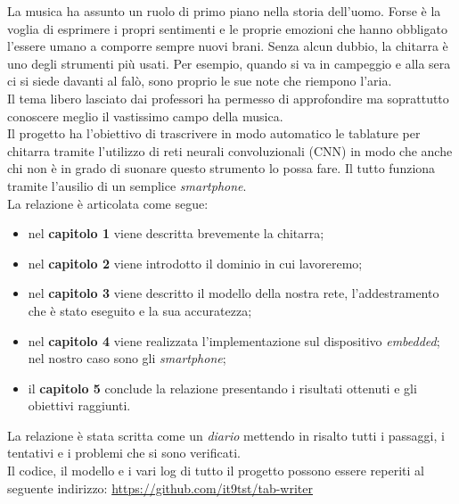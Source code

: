 La musica ha assunto un ruolo di primo piano nella storia dell'uomo. Forse è la voglia di esprimere i propri sentimenti e le proprie emozioni che hanno obbligato l'essere umano a comporre sempre nuovi brani. Senza alcun dubbio, la chitarra è uno degli strumenti più usati. Per esempio, quando si va in campeggio e alla sera ci si siede davanti al falò, sono proprio le sue note che riempono l'aria.\\ Il tema libero lasciato dai professori ha permesso di approfondire ma soprattutto conoscere meglio il vastissimo campo della musica.  \\ Il progetto ha l'obiettivo di trascrivere in modo automatico le tablature per chitarra tramite l'utilizzo di reti neurali convoluzionali (CNN) in modo che anche chi non è in grado di suonare questo strumento lo possa fare. Il tutto funziona tramite l'ausilio di un semplice \textit{smartphone}. \\

La relazione è articolata come segue:
\begin{itemize}
	\item nel \textbf{capitolo 1} viene descritta brevemente la chitarra;
	\item nel \textbf{capitolo 2} viene introdotto il dominio in cui lavoreremo;
	\item nel \textbf{capitolo 3} viene descritto il modello della nostra rete, l'addestramento che è stato eseguito e la sua accuratezza;
	\item nel \textbf{capitolo 4} viene realizzata l'implementazione sul dispositivo \textit{embedded}; nel nostro caso sono gli \textit{smartphone};
	\item il \textbf{capitolo 5} conclude la relazione presentando i risultati ottenuti e gli obiettivi raggiunti.
\end{itemize}
La relazione è stata scritta come un \textit{diario} mettendo in risalto tutti i passaggi, i tentativi e i problemi che si sono verificati.\\
\newline
Il codice, il modello e i vari log di tutto il progetto possono essere reperiti al seguente indirizzo: \href{https://github.com/it9tst/tab-writer}{https://github.com/it9tst/tab-writer} 
 